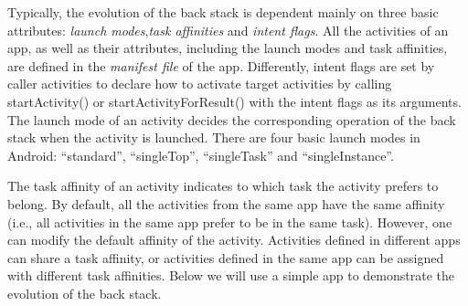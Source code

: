 Typically, the evolution of the back stack is dependent mainly on three basic attributes: \emph{launch modes},\emph{task affinities} and \emph{intent flags}. All the activities of an app, as well as their attributes, including the launch modes and task affinities, are defined in the \emph{manifest file} of the app. Differently, intent flags are set by caller activities to declare how to activate target activities by calling startActivity() or startActivityForResult() with the intent flags as its arguments. The launch mode of an activity decides the corresponding operation of the back stack when the activity is launched. There are four basic launch modes in Android: ``standard'', ``singleTop'', ``singleTask'' and ``singleInstance''. 

The task affinity of an activity indicates to which task the activity prefers to belong. By default, all the activities from the same app have the same affinity (i.e., all activities in the same app prefer to be in the same task). However, one can modify the default affinity of the activity. Activities defined in different apps can share a task affinity, or activities defined in the same app can be assigned with different task affinities. Below we will use a simple app to demonstrate the evolution of the back stack.

